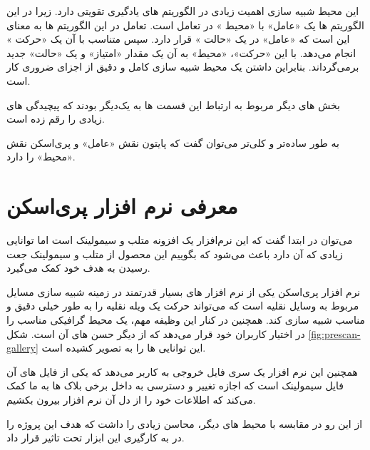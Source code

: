 \begin{note}


این محیط شبیه سازی اهمیت زیادی در الگوریتم های یادگیری تقویتی دارد. زیرا در این الگوریتم ها یک «عامل» با «محیط
» در تعامل است. تعامل در این الگوریتم ها به معنای این است که «عامل» در یک «حالت
» قرار دارد. سپس متناسب با آن یک «حرکت
» انجام می‌دهد. با این «حرکت»، «محیط» به آن یک مقدار «امتیاز» و یک «حالت» جدید بر‌می‌گرداند. 
بنابراین داشتن یک محیط شبیه سازی کامل و دقیق از اجزای ضروری کار است.

\end{note}

بخش های دیگر مربوط به ارتباط این قسمت ها به یک‌دیگر بودند که پیچیدگی های زیادی را رقم زده است.

به طور ساده‌تر و کلی‌تر می‌توان گفت که پایتون نقش «عامل» و پری‌اسکن نقش «محیط» را دارد.

\section{معرفی نرم افزار پری‌اسکن}
می‌توان در ابتدا گفت که این نرم‌افزار یک افزونه متلب و سیمولینک است اما توانایی زیادی که آن دارد باعث می‌شود که بگوییم این محصول از متلب و سیمولینک جعت رسیدن به هدف خود کمک می‌گیرد.

نرم افزار پری‌اسکن یکی از نرم افزار های بسیار قدرتمند در زمینه شبیه سازی مسایل مربوط به وسایل نقلیه است که می‌تواند حرکت یک ویله نقلیه را به طور خیلی دقیق و مناسب شبیه سازی کند. همچنین در کنار این وظیفه مهم، یک محیط گرافیکی مناسب را در اختیار کاربران خود قرار می‌دهد که از دیگر حسن های آن است.
شکل 
\ref*{fig:prescan-gallery} این توانایی ها را به تصویر کشیده است.
 
همچنین این نرم افزار یک سری فایل خروجی به کاربر می‌دهد که یکی از فایل های آن فایل سیمولینک است که اجازه تغییر و دسترسی به داخل برخی بلاک ها به ما کمک می‌کند که اطلاعات خود را از دل آن نرم افزار بیرون بکشیم.

از این رو در مقابسه با محیط های دیگر، محاسن زیادی را داشت که هدف این پروژه را در به کار‌گیری این ابزار تحت تاثیر قرار داد.



